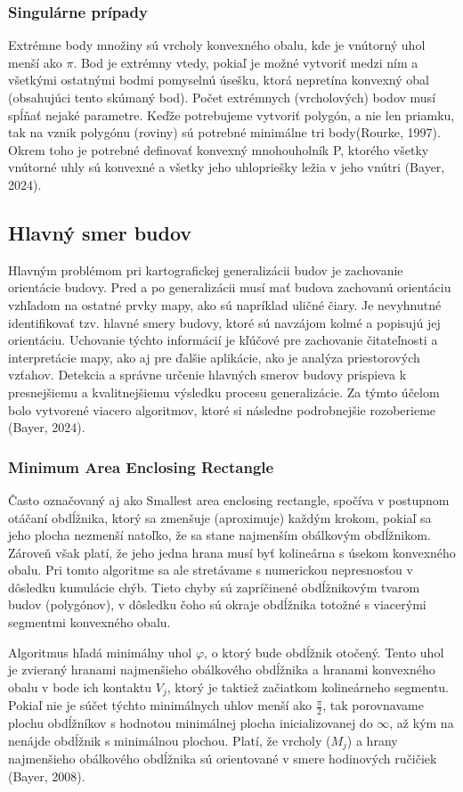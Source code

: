 \documentclass[12pt]{article}
\begin{document}
\subsubsection*{Singulárne prípady}
Extrémne body množiny sú vrcholy konvexného obalu, kde je vnútorný uhol menší ako \( \pi \). Bod je extrémny vtedy, pokiaľ je možné vytvoriť medzi ním a všetkými ostatnými bodmi pomyselnú úsešku, ktorá nepretína konvexný obal (obsahujúci tento skúmaný bod). Počet extrémnych (vrcholových) bodov musí spĺňať nejaké parametre. Keďže potrebujeme vytvoriť polygón, a nie len priamku, tak na vznik polygónu (roviny) sú potrebné minimálne tri body(Rourke, 1997).
Okrem toho je potrebné definovať konvexný mnohouholník P, ktorého všetky vnútorné uhly sú konvexné a všetky jeho uhlopriešky ležia v jeho vnútri (Bayer, 2024).
\subsection*{Hlavný smer budov}
Hlavným problémom pri kartografickej generalizácii budov je zachovanie orientácie budovy. Pred a po generalizácii musí mať budova zachovanú orientáciu vzhľadom na ostatné prvky mapy, ako sú napríklad uličné čiary. Je nevyhnutné identifikovať tzv. hlavné smery budovy, ktoré sú navzájom kolmé a popisujú jej orientáciu. Uchovanie týchto informácií je kľúčové pre zachovanie čitateľnosti a interpretácie mapy, ako aj pre ďalšie aplikácie, ako je  analýza priestorových vzťahov. Detekcia a správne určenie hlavných smerov budovy prispieva k presnejšiemu a kvalitnejšiemu výsledku procesu generalizácie. Za týmto účelom bolo vytvorené viacero algoritmov, ktoré si následne podrobnejšie rozoberieme (Bayer, 2024).


\subsubsection*{Minimum Area Enclosing Rectangle}
Často označovaný aj ako Smallest area enclosing rectangle, spočíva v postupnom otáčaní obdĺžnika, ktorý sa zmenšuje (aproximuje) každým krokom, pokiaľ sa jeho plocha nezmenší natoľko, že sa stane najmenším obálkovým obdĺžnikom. Zároveň však platí, že jeho jedna hrana musí byť kolineárna s úsekom konvexného obalu. Pri tomto algoritme sa ale stretávame s numerickou nepresnosťou v dôsledku kumulácie chýb. Tieto chyby sú zapríčinené obdĺžnikovým tvarom budov (polygónov), v dôsledku čoho sú okraje obdĺžnika totožné s viacerými segmentmi konvexného obalu.\par
Algoritmus hľadá minimálny uhol $\varphi$, o ktorý bude obdĺžnik otočený. Tento uhol je zvieraný hranami najmenšieho obálkového obdĺžnika a hranami konvexného obalu v bode ich kontaktu $V_j$, ktorý je taktiež začiatkom kolineárneho segmentu. Pokiaľ nie je súčet týchto minimálnych uhlov menší ako $\frac{\pi}{2}$, tak porovnavame plochu obdĺžníkov s hodnotou minimálnej plocha inicializovanej do $\infty$, až kým na nenájde obdĺžnik s minimálnou plochou. Platí, že vrcholy ($M_j$) a hrany najmenšieho obálkového obdĺžnika sú orientované v smere hodinových ručičiek (Bayer, 2008).
\end{document}
